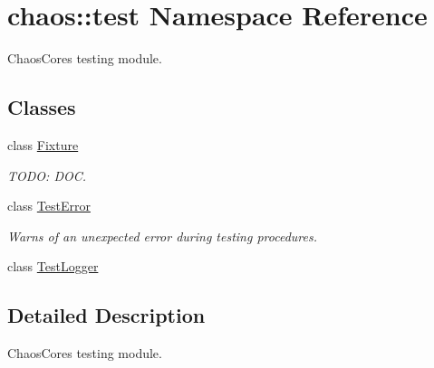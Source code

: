 \hypertarget{namespacechaos_1_1test}{}\section{chaos\+:\+:test Namespace Reference}
\label{namespacechaos_1_1test}


Chaos\+Core\textquotesingle{}s testing module.  


\subsection*{Classes}
\begin{DoxyCompactItemize}
\item 
class \hyperlink{classchaos_1_1test_1_1_fixture}{Fixture}
\begin{DoxyCompactList}\small\item\em T\+O\+D\+O\+: D\+O\+C. \end{DoxyCompactList}\item 
class \hyperlink{classchaos_1_1test_1_1_test_error}{Test\+Error}
\begin{DoxyCompactList}\small\item\em Warns of an unexpected error during testing procedures. \end{DoxyCompactList}\item 
class \hyperlink{classchaos_1_1test_1_1_test_logger}{Test\+Logger}
\end{DoxyCompactItemize}


\subsection{Detailed Description}
Chaos\+Core\textquotesingle{}s testing module. 